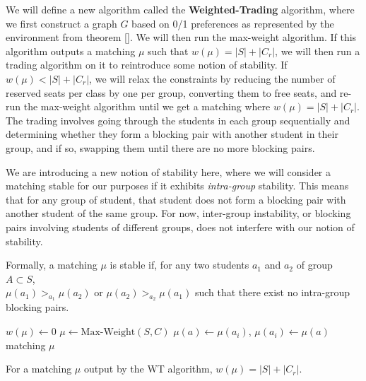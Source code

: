 We will define a new algorithm called the \textbf{Weighted-Trading}
algorithm, where we first construct a graph $G$ based on 0/1 preferences as
represented by the environment from theorem []. We will then run the max-weight
algorithm. If this algorithm outputs a matching $\mu$ such that $w(\mu) = |S| +
  |C_r|$, we will then run a trading algorithm on it to reintroduce some notion of
stability. If $w(\mu) < |S| + |C_r|$, we will relax the constraints by reducing
the number of reserved seats per class by one per group, converting them to free seats,
and re-run the max-weight algorithm until
we get a matching where $w(\mu) = |S| + |C_r|$. The trading involves going
through the students in each group sequentially and determining whether they
form a blocking pair with another student in their group, and if so, swapping
them until there are no more blocking pairs.

We are introducing a new notion of stability here, where we will consider a
matching stable for our purposes if it exhibits \textit{intra-group} stability.
This means that for any group of student, that student does not form a blocking
pair with another student of the same group. For now, inter-group instability, or
blocking pairs involving students of different groups, does not interfere with
our notion of stability.

Formally, a matching $\mu$ is stable if, for any two students $a_1$ and $a_2$ of
group $A \subset S$, \\ $\mu(a_1) >_{a_1} \mu(a_2)$  or $\mu(a_2) >_{a_2}
  \mu(a_1)$ such that there exist no intra-group blocking pairs.

\begin{algorithm}
  \caption{Weighted-Trading Algorithm \textit{WT}}
  \label{WT-alg}
  \begin{algorithmic}[1] \State $w(\mu) \gets 0$  \State $\mu \gets \text{Max-Weight}(S, C)$  \EndWhile {}
     \State $\mu(a) \gets \mu(a_i)$,
    $\mu(a_i) \gets \mu(a)$ \EndWhile \EndFor \State \Return matching $\mu$
  \end{algorithmic}
\end{algorithm}

\begin{theorem}
  For a matching $\mu$ output by the WT algorithm, $w(\mu) = |S| +
    |C_r|$.
\end{theorem}

